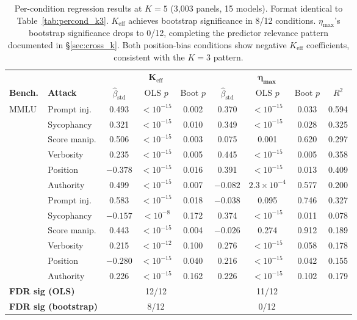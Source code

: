 \begin{table}[t]
\centering
\footnotesize
\setlength{\tabcolsep}{3pt}
\caption{Per-condition regression results at $K{=}5$ (3{,}003 panels, 15 models). Format identical to Table~\ref{tab:percond_k3}. $K_{\mathrm{eff}}$ achieves bootstrap significance in 8/12 conditions. $\eta_{\max}$'s bootstrap significance drops to 0/12, completing the predictor relevance pattern documented in \S\ref{sec:cross_k}. Both position-bias conditions show negative $K_{\mathrm{eff}}$ coefficients, consistent with the $K{=}3$ pattern.}
\label{tab:percond_k5}
\begin{tabular}{llccccccc}
\toprule
& & \multicolumn{3}{c}{$\boldsymbol{K_{\mathrm{eff}}}$} & \multicolumn{3}{c}{$\boldsymbol{\eta_{\max}}$} & \\
\cmidrule(lr){3-5} \cmidrule(lr){6-8}
\textbf{Bench.} & \textbf{Attack} & $\hat{\beta}_{\mathrm{std}}$ & OLS $p$ & Boot $p$ & $\hat{\beta}_{\mathrm{std}}$ & OLS $p$ & Boot $p$ & $R^2$ \\
\midrule
\multirow{6}{*}{MMLU} & Prompt inj. & 0.493 & ${<}10^{-15}$ & 0.002 & 0.370 & ${<}10^{-15}$ & 0.033 & 0.594 \\
& Sycophancy & 0.321 & ${<}10^{-15}$ & 0.010 & 0.349 & ${<}10^{-15}$ & 0.028 & 0.325 \\
& Score manip. & 0.506 & ${<}10^{-15}$ & 0.003 & 0.075 & 0.001 & 0.620 & 0.297 \\
& Verbosity & 0.235 & ${<}10^{-15}$ & 0.005 & 0.445 & ${<}10^{-15}$ & 0.005 & 0.358 \\
& Position & $-0.378$ & ${<}10^{-15}$ & 0.016 & 0.391 & ${<}10^{-15}$ & 0.013 & 0.409 \\
& Authority & 0.499 & ${<}10^{-15}$ & 0.007 & $-0.082$ & $2.3{\times}10^{-4}$ & 0.577 & 0.200 \\
\addlinespace
\multirow{6}{*}{ARC} & Prompt inj. & 0.583 & ${<}10^{-15}$ & 0.018 & $-0.038$ & 0.095 & 0.746 & 0.327 \\
& Sycophancy & $-0.157$ & ${<}10^{-8}$ & 0.172 & 0.374 & ${<}10^{-15}$ & 0.011 & 0.078 \\
& Score manip. & 0.443 & ${<}10^{-15}$ & 0.004 & $-0.026$ & 0.274 & 0.912 & 0.189 \\
& Verbosity & 0.215 & ${<}10^{-12}$ & 0.100 & 0.276 & ${<}10^{-15}$ & 0.058 & 0.178 \\
& Position & $-0.280$ & ${<}10^{-15}$ & 0.040 & 0.216 & ${<}10^{-15}$ & 0.042 & 0.155 \\
& Authority & 0.226 & ${<}10^{-15}$ & 0.162 & 0.226 & ${<}10^{-15}$ & 0.102 & 0.179 \\
\midrule
\multicolumn{2}{l}{\textbf{FDR sig (OLS)}} & \multicolumn{3}{c}{12/12} & \multicolumn{3}{c}{11/12} & \\
\multicolumn{2}{l}{\textbf{FDR sig (bootstrap)}} & \multicolumn{3}{c}{8/12} & \multicolumn{3}{c}{0/12} & \\
\bottomrule
\end{tabular}
\end{table}

